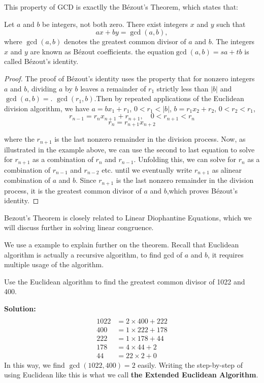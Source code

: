         This property of GCD is exactlly the Bézout's Theorem, which states that:
        \begin{theorem}
            Let $a$ and $b$ be integers, not both zero. There exist integers $x$ and $y$ such that
            \[
            ax + by = \gcd(a, b),
            \]
            where $\gcd(a, b)$ denotes the greatest common divisor of $a$ and $b$. The integers $x$ and $y$ are known as Bézout coefficients.
            the equation$ \gcd(a, b) = sa + tb$ is called Bézout's identity.
        \end{theorem}
        \begin{proof}
            The proof of Bézout's identity uses the property that for nonzero integers $a$ and $b$, dividing $a$ by 
            $b$ leaves a remainder of $r_1$ strictly less than $|b|$ and $\gcd(a,b)=$.
            $\gcd(r_1,b)$.Then by repeated applications of the Euclidean division algorithm, we have
            $a=bx_1+r_1$, $0<r_1<|b|$, $b=r_1x_2+r_2$, $0<r_2<r_1$,
            $$r_{n-1}=r_nx_{n+1}+r_{n+1},\quad0<r_{n+1}<r_n$$
            $$r_n=r_{n+1}x_{n+2}$$

            where the $r_{n+1}$ is the last nonzero remainder in the division process. Now, as illustrated in the example above, we can use the second to last equation to solve for $r_{n+1}$ as a combination of $r_n$ and $r_{n-1}$. Unfolding this, we can solve for $r_n$ as a combination of $r_{n-1}$ and $r_{n-2}$ etc. until we eventually write $r_{n+1}$ as alinear
            combination of $a$ and $b$. Since $r_{n+1}$ is the last nonzero remainder in the division process, it is the greatest common divisor of $a$ and $b$,which proves Bézout's identity.
        \end{proof}
        \begin{remark}
            Bezout's Theorem is closely related to Linear Diophantine Equations, which we will
            discuss further in solving linear congruence.
        \end{remark}

        We use a example to explain further on the theorem. Recall that Euclidean algorithm is actually a recursive algorithm, to find
        gcd of $a$ and $b$, it requires multiple usage of the algorithm.
        \begin{example} 
            Use the Euclidean algorithm to find the greatest common divisor of 1022 and 400.
        \end{example}   
        \textbf{Solution:}
$$
        \begin{aligned}\\
            1022&=2\times400+222\\
            400&=1\times 222+178\\
            222&=1\times 178+44\\
            178&=4\times 44+2\\
            44&=22\times2+0
            \end{aligned}
   $$ 
        In this way, we find $\gcd(1022,400)=2$ easily. Writing the step-by-step of using Euclidean like this is what we call \textbf{the
        Extended Euclidean Algorithm}. 

